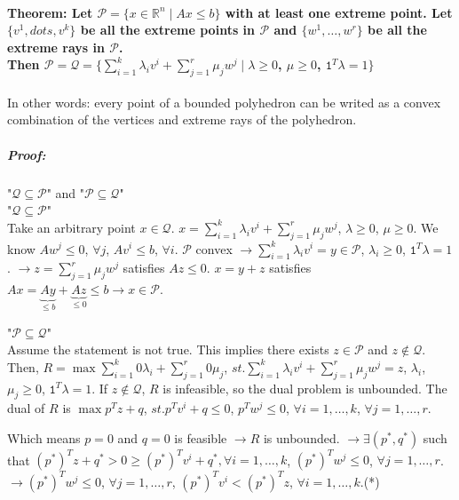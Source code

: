 \documentclass[main]{subfiles}
\begin{document}
\paragraph{Theorem: Let $\mathcal{P} = \{x \in \mathbb{R}^n \mid Ax \leq b\}$
with at least one extreme point. Let $\{v^1, dots, v^k\}$ be all the extreme
points in $\mathcal{P}$ and $\{w^1, \dots, w^r\}$ be all the extreme rays in
$\mathcal{P}$. \\ Then $\mathcal{P} = \mathcal{Q} = \{ \sum_{i =1}^{k}
\lambda_i v^i + \sum_{j=1}^{r} \mu_j w^j \mid \lambda \geq 0$, $\mu \geq 0$,
$\mathtt{1}^T \lambda =1 \}$}
In other words: every point of a bounded polyhedron can be writed as a convex
combination of the vertices and extreme rays of the polyhedron.

\subparagraph{Proof:} "$\mathcal{Q} \subseteq \mathcal{P}$" and "$\mathcal{P} \subseteq \mathcal{Q}$"\\

"$\mathcal{Q} \subseteq \mathcal{P}$"\\
Take an arbitrary point $x \in \mathcal{Q}$. $x = \sum_{i =1}^{k} \lambda_i v^i
+ \sum_{j=1}^{r} \mu_j w^j$, $\lambda \geq 0$, $\mu \geq 0$. We know $A w^j
\leq 0$, $\forall j$, $Av^i \leq b$, $\forall i$.
$\mathcal{P}$ convex $\rightarrow \sum_{i=1}^{k} \lambda_i v^i = y \in
\mathcal{P}$, $\lambda_i \geq 0$, $\mathtt{1}^T \lambda = 1$.
$\rightarrow z = \sum_{j = 1}^{r} \mu_j w^j$ satisfies $Az \leq 0$. $x = y + z$
satisfies $Ax = \underbrace{Ay}_{\leq b} + \underbrace{Az}_{\leq 0} \leq b
\rightarrow x \in \mathcal{P}$.

"$\mathcal{P} \subseteq \mathcal{Q}$"\\
Assume the statement is not true. This implies there exists $z \in \mathcal{P}$
and $z \notin \mathcal{Q}$.
Then, $R = \max \sum_{i = 1}^{k} 0\lambda_i + \sum_{j=1}^{r} 0 \mu_j$, $st.
\sum_{i = 1}^{k} \lambda_i v^i + \sum_{j = 1}^{r} \mu_j w^j = z$, $\lambda_i$,
$\mu_j \geq 0$, $\mathtt{1}^T \lambda = 1$. If $z \notin \mathcal{Q}$, $R$ is
infeasible, so the dual problem is unbounded. The dual of $R$ is
$\max p^T z + q$, $st. p^T v^i + q \leq 0$, $p^T w^j \leq 0$, $\forall i =1,
\dots, k$, $\forall j = 1, \dots, r$.

Which means $p = 0$ and $q = 0$ is feasible $\rightarrow R$ is unbounded.
$\rightarrow \exists (p^*, q^*)$ such that $(p^*)^T z + q^* > 0 \geq (p^*)^T
v^i + q^*, \forall i = 1, \dots, k$, $(p^*)^T w^j \leq 0$, $\forall j = 1,
\dots, r$. \\

$\rightarrow (p^*)^T w^j \leq 0$, $\forall j = 1, \dots, r$, $(p^*)^T v^i <
(p^*)^T z$, $\forall i = 1, \dots, k$.(*)
\end{document}
